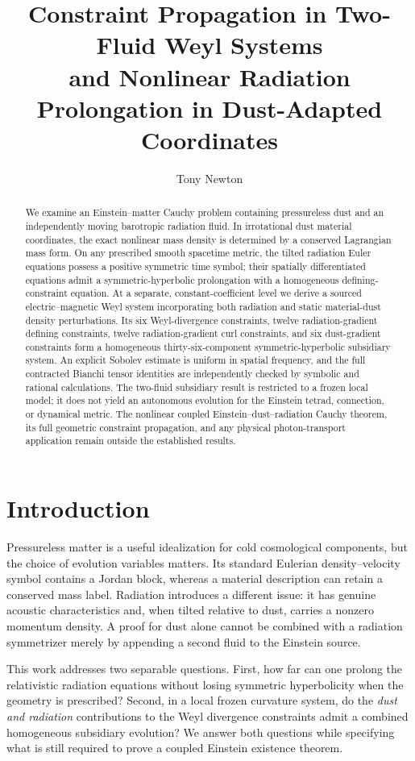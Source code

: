 \documentclass[10pt,a4paper]{article}
\title{\bfseries Constraint Propagation in Two-Fluid Weyl Systems\\[4pt]
\large and Nonlinear Radiation Prolongation in Dust-Adapted Coordinates}
\author{Tony Newton}
\date{}
\begin{document}
\maketitle
\begin{abstract}
We examine an Einstein--matter Cauchy problem containing pressureless dust and an independently moving barotropic radiation fluid. In irrotational dust material coordinates, the exact nonlinear mass density is determined by a conserved Lagrangian mass form. On any prescribed smooth spacetime metric, the tilted radiation Euler equations possess a positive symmetric time symbol; their spatially differentiated equations admit a symmetric-hyperbolic prolongation with a homogeneous defining-constraint equation. At a separate, constant-coefficient level we derive a sourced electric--magnetic Weyl system incorporating both radiation and static material-dust density perturbations. Its six Weyl-divergence constraints, twelve radiation-gradient defining constraints, twelve radiation-gradient curl constraints, and six dust-gradient constraints form a homogeneous thirty-six-component symmetric-hyperbolic subsidiary system. An explicit Sobolev estimate is uniform in spatial frequency, and the full contracted Bianchi tensor identities are independently checked by symbolic and rational calculations. The two-fluid subsidiary result is restricted to a frozen local model; it does not yield an autonomous evolution for the Einstein tetrad, connection, or dynamical metric. The nonlinear coupled Einstein--dust--radiation Cauchy theorem, its full geometric constraint propagation, and any physical photon-transport application remain outside the established results.
\end{abstract}

\section{Introduction}
Pressureless matter is a useful idealization for cold cosmological components, but the choice of evolution variables matters. Its standard Eulerian density--velocity symbol contains a Jordan block, whereas a material description can retain a conserved mass label. Radiation introduces a different issue: it has genuine acoustic characteristics and, when tilted relative to dust, carries a nonzero momentum density. A proof for dust alone cannot be combined with a radiation symmetrizer merely by appending a second fluid to the Einstein source.

This work addresses two separable questions. First, how far can one prolong the relativistic radiation equations without losing symmetric hyperbolicity when the geometry is prescribed? Second, in a local frozen curvature system, do the \emph{dust and radiation} contributions to the Weyl divergence constraints admit a combined homogeneous subsidiary evolution? We answer both questions while specifying what is still required to prove a coupled Einstein existence theorem.
\end{document}
